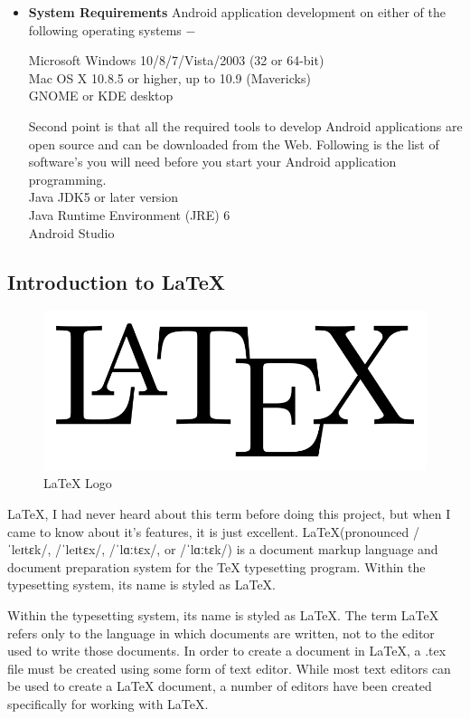 \begin{itemize}
\item \textbf{System Requirements}
Android application development on either of the following operating systems −
\vskip 0.1in

Microsoft Windows 10/8/7/Vista/2003 (32 or 64-bit)
\\Mac OS X 10.8.5 or higher, up to 10.9 (Mavericks)
\\GNOME or KDE desktop
\vskip 0.1in

Second point is that all the required tools to develop Android applications are open source and can be downloaded from the Web. Following is the list of software's you will need before you start your Android application programming.\\

Java JDK5 or later version
\\Java Runtime Environment (JRE) 6
\\Android Studio
\end{itemize}

\subsection{Introduction to \LaTeX}
\begin{figure}[ht]
\centering
\includegraphics[scale=0.2]{images/latex.png}
\caption{\LaTeX{} Logo}
\end{figure}
\hspace{-1.8em} \LaTeX{}, I had never heard about this term before doing this project,
but when I came to know about it's features, it is just excellent. 
\LaTeX (pronounced /ˈleɪtɛk/, /ˈleɪtɛx/, /ˈlɑːtɛx/, or /ˈlɑːtɛk/) is a 
document markup language and document preparation system for the \TeX{} 
typesetting  program. Within the typesetting system, its name is styled 
as \LaTeX.

\hspace{-1.8em} Within the typesetting system, its name is styled as \LaTeX. The term 
\LaTeX{} refers only to the language in which documents are written, 
not to the editor used to write those documents. In order to create a 
document in \LaTeX, a .tex file must be created using some form of text 
editor. While most text editors can be used to create a \LaTeX{} document, 
a number of editors have been created specifically for working with \LaTeX.\\

